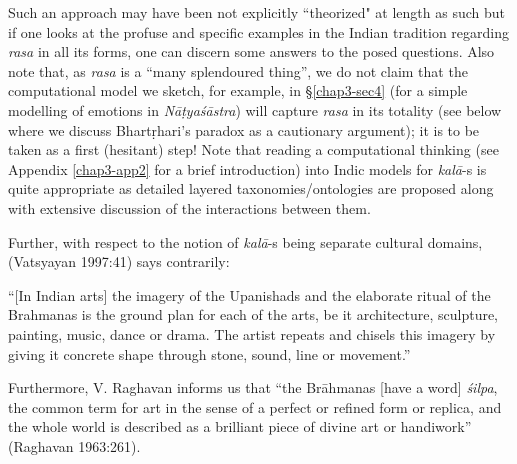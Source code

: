 Such an approach may have been not explicitly “theorized" at length as such but if one looks at the profuse and specific examples in the Indian tradition regarding \textsl{rasa} in all its forms, one can discern some answers to the posed questions. Also note that, as \textsl{rasa} is a “many splendoured thing”, we do not claim that the computational model we sketch, for example, in \S\ref{chap3-sec4} (for a simple modelling of emotions in \textsl{Nāṭyaśāstra}) will capture \textsl{rasa} in its totality (see below where we discuss Bhartṛhari’s paradox as a cautionary argument); it is to be taken as a first (hesitant) step! Note that reading a computational thinking (see Appendix \ref{chap3-app2} for a brief introduction) into Indic models for \textsl{kalā}-s is quite appropriate as detailed layered taxonomies/ontologies are proposed along with extensive discussion of the interactions between them.
\newpage

Further, with respect to the notion of \textsl{kalā}-s being separate cultural domains, (Vatsyayan
 1997:41) says contrarily:


\begin{myquote}
“[In Indian arts] the imagery of the Upanishads and the elaborate ritual of the Brahmanas is the ground plan for each of the arts, be it architecture, sculpture, painting, music, dance or drama. The artist repeats and chisels this imagery by giving it concrete shape through stone, sound, line or movement.”
\end{myquote}

Furthermore, V. Raghavan informs us that “the Brāhmanas [have a word] \textsl{śilpa}, the common term for art in the sense of a perfect or refined form or replica, and the whole world is described as a brilliant piece of divine art or handiwork” (Raghavan 1963:261).

